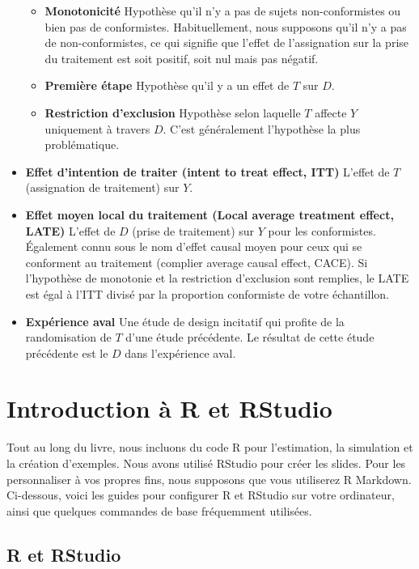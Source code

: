 \documentclass[
  12pt,
]{book}
\providecommand{\tightlist}{%
  \setlength{\itemsep}{0pt}\setlength{\parskip}{0pt}}
\begin{document}
\begin{itemize}
  \begin{itemize}
  \tightlist
  \item
    \textbf{Monotonicité} Hypothèse qu'il n'y a pas de sujets non-conformistes ou bien pas de conformistes.
    Habituellement, nous supposons qu'il n'y a pas de non-conformistes, ce qui signifie que l'effet de l'assignation sur la prise du traitement est soit positif, soit nul mais pas négatif.
  \item
    \textbf{Première étape} Hypothèse qu'il y a un effet de \(T\) sur \(D\).
  \item
    \textbf{Restriction d'exclusion} Hypothèse selon laquelle \(T\) affecte \(Y\) uniquement à travers \(D\). C'est généralement l'hypothèse la plus problématique.
  \end{itemize}
\item
  \textbf{Effet d'intention de traiter (intent to treat effect, ITT)} L'effet de \(T\) (assignation de traitement) sur \(Y\).
\item
  \textbf{Effet moyen local du traitement (Local average treatment effect, LATE)} L'effet de \(D\) (prise de traitement) sur \(Y\) pour les conformistes.
  Également connu sous le nom d'effet causal moyen pour ceux qui se conforment au traitement (complier average causal effect, CACE).
  Si l'hypothèse de monotonie et la restriction d'exclusion sont remplies, le LATE est égal à l'ITT divisé par la proportion conformiste de votre échantillon.
\item
  \textbf{Expérience aval} Une étude de design incitatif qui profite de la randomisation de \(T\) d'une étude précédente.
  Le résultat de cette étude précédente est le \(D\) dans l'expérience aval.
\end{itemize}

\hypertarget{introduction-uxe0-r-et-rstudio}{%
\chapter{Introduction à R et RStudio}\label{introduction-uxe0-r-et-rstudio}}

Tout au long du livre, nous incluons du code R pour l'estimation, la simulation et la création d'exemples. Nous avons utilisé RStudio pour créer les slides. Pour les personnaliser à vos propres fins, nous supposons que vous utiliserez R Markdown. Ci-dessous, voici les guides pour configurer R et RStudio sur votre ordinateur, ainsi que quelques commandes de base fréquemment utilisées.

\hypertarget{r-et-rstudio}{%
\section{R et RStudio}\label{r-et-rstudio}}
\end{document}
